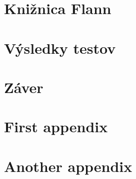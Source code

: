 \documentclass[12pt,oneside]{fithesis2}
\begin{document}
	\chapter{Knižnica Flann}

    \chapter{Výsledky testov}
    
    \chapter{Záver}

    \chapter{First appendix}        %

    \chapter{Another appendix}

\end{document}
